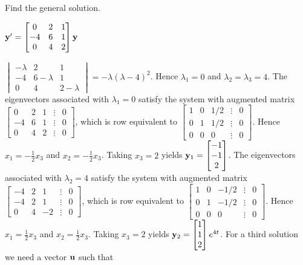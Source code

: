 \documentclass{ximera}
\begin{document}
 \begin{problem}\label{exer:10.5.8} 
 Find the general solution.
 
 $ {\bf
y'}= \begin{bmatrix}0&2&1\\-4&6&1\\0&4&2\end{bmatrix}{\bf y}$

\begin{solution}
    $ \begin{vmatrix}-\lambda&2&1\\-4&6-\lambda&1\\0&4&2-\lambda\end{vmatrix}
=-\lambda(\lambda-4)^2$.
Hence $\lambda_1=0$ and  $\lambda_2=\lambda_3=4$.
The eigenvectors associated
 with $\lambda_1=0$ satisfy the system with  augmented matrix
$  \begin{bmatrix}0&2&1&\vdots&0\\{-4}&6&1&
\vdots&0\\0&4&2&\vdots&0 \end{bmatrix}$,
which is row equivalent to
$  \begin{bmatrix}1&0&1/2&\vdots&0\\0&1&1/2&
\vdots&0\\0&0&0&\vdots&0 \end{bmatrix}$.
Hence  $x_1=-\frac{1 }{2}x_3$ and $x_2=-\frac{1 }{2}x_3$.  Taking $x_3=2$
yields
${\bf y}_1=  \begin{bmatrix}-1\\-1\\2\end{bmatrix}$.
The eigenvectors associated
 with $\lambda_2=4$ satisfy the system with  augmented matrix
$  \begin{bmatrix}-4&2&1&\vdots&0\\-4&2&1&
\vdots&0\\0&4&-2&\vdots&0 \end{bmatrix}$,
which is row equivalent to
$  \begin{bmatrix}1&0&-1/2&\vdots&0\\0&1&-1/2&
\vdots&0\\0&0&0&\vdots&0 \end{bmatrix}$.
Hence  $x_1=\frac{1 }{2}x_3$ and $x_2=\frac{1 }{2}x_3$.  Taking
$x_3=2$ yields
${\bf y}_2=  \begin{bmatrix}1\\1\\2\end{bmatrix}e^{4t}$.
For a third solution we need a vector ${\bf u}$ such that

\end{solution}
\end{problem}
\end{document}
